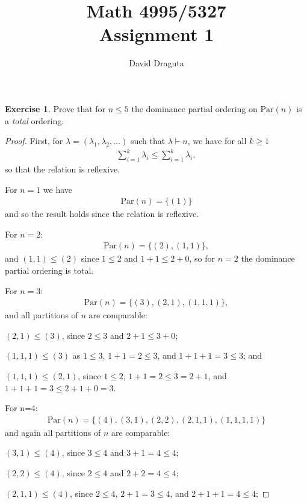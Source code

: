 \documentclass[12pt]{extarticle}
\title{ Math 4995/5327
  \\
  Assignment 1}
\author{David Draguta}
\newcommand{\set}[1]{\{#1\}}
\newcommand{\<}{\langle}
\renewcommand{\>}{\rangle}
\theoremstyle{definition}
\newtheorem{exercise}{Exercise}
\begin{document}
\maketitle

\begin{exercise}
  Prove that for $n \leq 5$ the dominance partial ordering on $\text{Par}(n)$ is a \textit{total} ordering. 
\end{exercise}
\begin{proof}
  First, for $\lambda = (\lambda_1, \lambda_2, \dots)$ such that $\lambda \vdash n$, we have for all $k \geq 1$
  \begin{align*}
    \sum\limits_{i=1}^k \lambda_i \leq \sum\limits_{i=1}^k \lambda_i,
  \end{align*}
  so that the relation is reflexive.

  For $n=1$ we have
  \begin{align*}
    \text{Par}(n) = \set{(1)}
  \end{align*}
  and so the result holds since the relation is reflexive.

  For $n=2$:
  \begin{align*}
    \text{Par}(n) = \set{(2), (1,1)},
  \end{align*}
  and $(1,1) \leq (2)$ since $ 1 \leq 2$ and $ 1 + 1 \leq 2 + 0$, so for $n=2$ the dominance partial ordering is total.
  
  For $n=3$:
  \begin{align*}
    \text{Par}(n) = \set{(3), (2,1), (1,1,1)},
  \end{align*}
  and all partitions of $n$ are comparable: 

  $(2,1) \leq (3)$, since $2 \leq 3$ and $2 + 1 \leq 3 + 0$;

  $(1,1,1) \leq (3)$ as $ 1 \leq 3$, $1 + 1 =2 \leq 3 $, and $1+1+1 = 3 \leq 3$; and

  $(1,1,1) \leq (2,1)$, since $1 \leq 2$, $1 + 1 = 2 \leq 3 = 2+1$, and $1+1+1=3 \leq 2+1+0 = 3$.

  For n=4:
  \begin{align*}
    \text{Par}(n) = \set{(4), (3,1), (2,2), (2,1,1), (1,1,1,1)}
  \end{align*}
  and again all partitions of $n$ are comparable:

  $(3,1) \leq (4)$, since $3 \leq 4$ and $3 + 1 = 4 \leq 4$;

  $(2,2) \leq (4)$, since $2 \leq 4$ and $2+2 = 4 \leq 4$;

  $(2,1,1) \leq (4)$, since $ 2 \leq 4 $, $2+1=3 \leq 4$, and $2+1+1 = 4 \leq 4$;


\end{proof}
\end{document}

